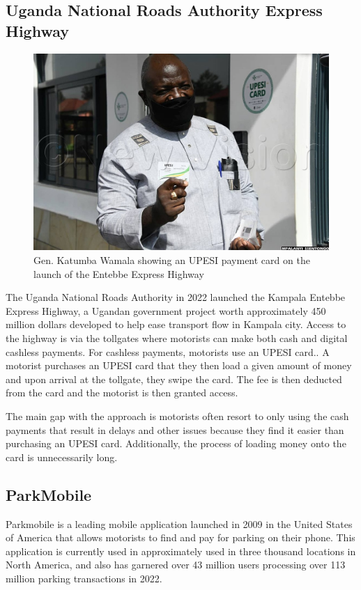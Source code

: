 \subsection{Uganda National Roads Authority Express Highway}
\begin{figure}[h]
    \begin{center}
        \includegraphics[scale = 0.3]{images/katus}
        \caption{Gen. Katumba Wamala showing an UPESI payment card on the launch of the Entebbe Express Highway}
    \end{center}
\end{figure}
The Uganda National Roads Authority in 2022 launched the Kampala Entebbe Express Highway, a Ugandan government project worth approximately 450 million dollars developed to help ease transport flow in Kampala city. Access to the highway is via the tollgates where motorists can make both cash and digital cashless payments. For cashless payments, motorists use an UPESI card.\cite{unra_news_2022}. A motorist purchases an UPESI card that they then load a given amount of money and upon arrival at the tollgate, they swipe the card. The fee is then deducted from the card and the motorist is then granted access.

The main gap with the approach is motorists often resort to only using the cash payments that result in delays and other issues because they find it easier than purchasing an UPESI card. Additionally, the process of loading money onto the card is unnecessarily long.

\subsection{ParkMobile}
Parkmobile is a leading mobile application launched in 2009 in the United States of America that allows motorists to find and pay for parking on their phone. This application is currently used in approximately used in three thousand locations in North America, and also has garnered over 43 million users processing over 113 million parking transactions in 2022.

